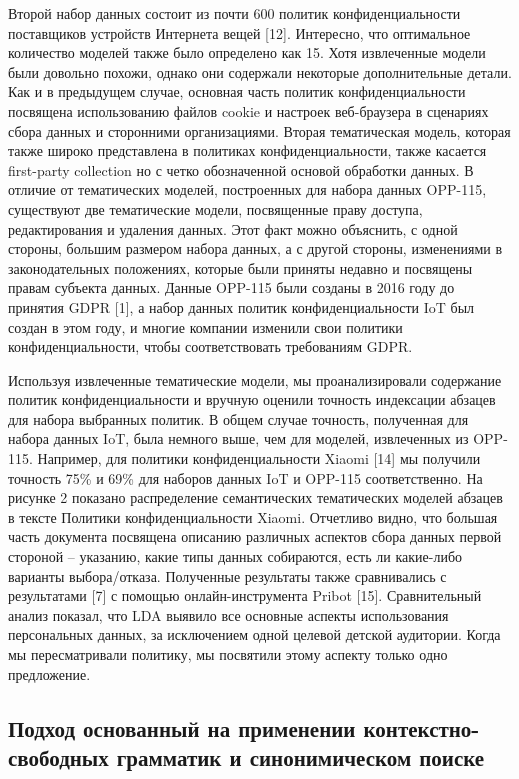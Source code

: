 \documentclass[../main]{subfiles}
\begin{document}
Второй набор данных состоит из почти 600 политик конфиденциальности поставщиков устройств Интернета вещей [12]. Интересно, что оптимальное количество моделей также было определено как 15. Хотя извлеченные модели были довольно похожи, однако они содержали некоторые дополнительные детали. Как и в предыдущем случае, основная часть политик конфиденциальности посвящена использованию файлов cookie и настроек веб-браузера в сценариях сбора данных и сторонними организациями. Вторая тематическая модель, которая также широко представлена в политиках конфиденциальности, также касается first-party collection но с четко обозначенной основой обработки данных. В отличие от тематических моделей, построенных для набора данных OPP-115, существуют две тематические модели, посвященные праву доступа, редактирования и удаления данных. Этот факт можно объяснить, с одной стороны, большим размером набора данных, а с другой стороны, изменениями в законодательных положениях, которые были приняты недавно и посвящены правам субъекта данных. Данные OPP-115 были созданы в 2016 году до принятия GDPR [1], а набор данных политик конфиденциальности IoT был создан в этом году, и многие компании изменили свои политики конфиденциальности, чтобы соответствовать требованиям GDPR.

Используя извлеченные тематические модели, мы проанализировали содержание политик конфиденциальности и вручную оценили точность индексации абзацев для набора выбранных политик. В общем случае точность, полученная для набора данных IoT, была немного выше, чем для моделей, извлеченных из OPP-115. Например, для политики конфиденциальности Xiaomi [14] мы получили точность 75\% и 69\% для наборов данных IoT и OPP-115 соответственно. На рисунке 2 показано распределение семантических тематических моделей абзацев в тексте Политики конфиденциальности Xiaomi. Отчетливо видно, что большая часть документа посвящена описанию различных аспектов сбора данных первой стороной – указанию, какие типы данных собираются, есть ли какие-либо варианты выбора/отказа. Полученные результаты также сравнивались с результатами [7] с помощью онлайн-инструмента Pribot [15]. Сравнительный анализ показал, что LDA выявило все основные аспекты использования персональных данных, за исключением одной целевой детской аудитории. Когда мы пересматривали политику, мы посвятили этому аспекту только одно предложение.

\subsection{Подход основанный на применении контекстно-свободных грамматик и синонимическом поиске}
\end{document}

